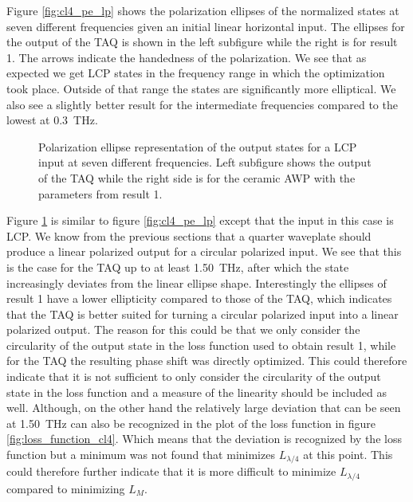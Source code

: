 Figure \ref{fig:cl4_pe_lp} shows the polarization ellipses of the normalized states at seven different frequencies given an initial linear horizontal input. The ellipses for the output of the TAQ is shown in the left subfigure while the right is for result 1. The arrows indicate the handedness of the polarization. We see that as expected we get LCP states in the frequency range in which the optimization took place. Outside of that range the states are significantly more elliptical. We also see a slightly better result for the intermediate frequencies compared to the lowest at \SI{0.3}{\tera \hertz}. 

\begin{figure}[ht]
    \centering
    
    \caption{Polarization ellipse representation of the output states for a LCP input at seven different frequencies. Left subfigure shows the output of the TAQ while the right side is for the ceramic AWP with the parameters from result 1.}
    \label{fig:cl4_pe_cp}
\end{figure}

Figure \ref{fig:cl4_pe_cp} is similar to figure \ref{fig:cl4_pe_lp} except that the input in this case is LCP. We know from the previous sections that a quarter waveplate should produce a linear polarized output for a circular polarized input. We see that this is the case for the TAQ up to at least \SI{1.50}{\tera \hertz}, after which the state increasingly deviates from the linear ellipse shape. Interestingly the ellipses of result 1 have a lower ellipticity compared to those of the TAQ, which indicates that the TAQ is better suited for turning a circular polarized input into a linear polarized output. The reason for this could be that we only consider the circularity of the output state in the loss function used to obtain result 1, while for the TAQ the resulting phase shift was directly optimized. This could therefore indicate that it is not sufficient to only consider the circularity of the output state in the loss function and a measure of the linearity should be included as well. Although, on the other hand the relatively large deviation that can be seen at \SI{1.50}{\tera \hertz} can also be recognized in the plot of the loss function in figure \ref{fig:loss_function_cl4}. Which means that the deviation is recognized by the loss function but a minimum was not found that minimizes $L_{\lambda/4}$ at this point. This could therefore further indicate that it is more difficult to minimize $L_{\lambda/4}$ compared to minimizing $L_M$.

